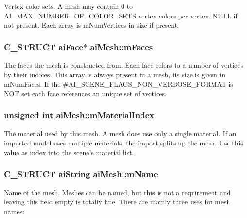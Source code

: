 Vertex color sets. A mesh may contain 0 to \hyperlink{ai_mesh_8h_a74ea1282873ac4b111b48d2380c26bdc}{A\-I\-\_\-\-M\-A\-X\-\_\-\-N\-U\-M\-B\-E\-R\-\_\-\-O\-F\-\_\-\-C\-O\-L\-O\-R\-\_\-\-S\-E\-T\-S} vertex colors per vertex. N\-U\-L\-L if not present. Each array is m\-Num\-Vertices in size if present. \hypertarget{structai_mesh_a5a65fbc7fdea7f8d36f39047425ece07}{
\subsubsection[{m\-Faces}]{\setlength{\rightskip}{0pt plus 5cm}C\-\_\-\-S\-T\-R\-U\-C\-T {\bf ai\-Face}$\ast$ ai\-Mesh\-::m\-Faces}}\label{structai_mesh_a5a65fbc7fdea7f8d36f39047425ece07}
The faces the mesh is constructed from. Each face refers to a number of vertices by their indices. This array is always present in a mesh, its size is given in m\-Num\-Faces. If the \#\-A\-I\-\_\-\-S\-C\-E\-N\-E\-\_\-\-F\-L\-A\-G\-S\-\_\-\-N\-O\-N\-\_\-\-V\-E\-R\-B\-O\-S\-E\-\_\-\-F\-O\-R\-M\-A\-T is N\-O\-T set each face references an unique set of vertices. \hypertarget{structai_mesh_aa2807c7ba172115203ed16047ad65f9e}{
\subsubsection[{m\-Material\-Index}]{\setlength{\rightskip}{0pt plus 5cm}unsigned int ai\-Mesh\-::m\-Material\-Index}}\label{structai_mesh_aa2807c7ba172115203ed16047ad65f9e}
The material used by this mesh. A mesh does use only a single material. If an imported model uses multiple materials, the import splits up the mesh. Use this value as index into the scene's material list. \hypertarget{structai_mesh_a8dd9433e0c5b008e3e5aee6c801d3b74}{
\subsubsection[{m\-Name}]{\setlength{\rightskip}{0pt plus 5cm}C\-\_\-\-S\-T\-R\-U\-C\-T {\bf ai\-String} ai\-Mesh\-::m\-Name}}\label{structai_mesh_a8dd9433e0c5b008e3e5aee6c801d3b74}
Name of the mesh. Meshes can be named, but this is not a requirement and leaving this field empty is totally fine. There are mainly three uses for mesh names\-:
